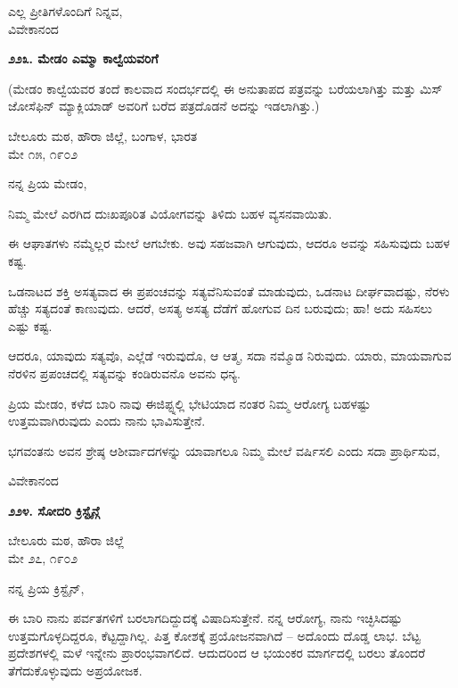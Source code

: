 \begin{flushright}
ಎಲ್ಲ ಪ್ರೀತಿಗಳೊಂದಿಗೆ ನಿನ್ನವ,\\ವಿವೇಕಾನಂದ
\end{flushright}

\begin{center}
\textbf{೨೨೩. ಮೇಡಂ ಎಮ್ಮಾ ಕಾಲ್ವೆಯವರಿಗೆ}
\end{center}

(ಮೇಡಂ ಕಾಲ್ವೆಯವರ ತಂದೆ ಕಾಲವಾದ ಸಂದರ್ಭದಲ್ಲಿ ಈ ಅನುತಾಪದ ಪತ್ರವನ್ನು ಬರೆಯಲಾಗಿತ್ತು ಮತ್ತು ಮಿಸ್ ಜೋಸೆಫಿನ್ ಮ್ಯಾಕ್ಲಿಯಾಡ್ ಅವರಿಗೆ ಬರೆದ ಪತ್ರದೊಡನೆ ಅದನ್ನು ಇಡಲಾಗಿತ್ತು.)

\begin{flushright}
ಬೇಲೂರು ಮಠ, ಹೌರಾ ಜಿಲ್ಲೆ, ಬಂಗಾಳ, ಭಾರತ\\ಮೇ ೧೫, ೧೯೦೨
\end{flushright}

ನನ್ನ ಪ್ರಿಯ ಮೇಡಂ,

ನಿಮ್ಮ ಮೇಲೆ ಎರಗಿದ ದುಃಖಪೂರಿತ ವಿಯೋಗವನ್ನು ತಿಳಿದು ಬಹಳ ವ್ಯಸನವಾಯಿತು.

ಈ ಆಘಾತಗಳು ನಮ್ಮೆಲ್ಲರ ಮೇಲೆ ಆಗಬೇಕು. ಅವು ಸಹಜವಾಗಿ ಆಗುವುದು, ಆದರೂ ಅವನ್ನು ಸಹಿಸುವುದು ಬಹಳ ಕಷ್ಟ.

ಒಡನಾಟದ ಶಕ್ತಿ ಅಸತ್ಯವಾದ ಈ ಪ್ರಪಂಚವನ್ನು ಸತ್ಯವೆನಿಸುವಂತೆ ಮಾಡುವುದು, ಒಡನಾಟ ದೀರ್ಘವಾದಷ್ಟು, ನೆರಳು ಹೆಚ್ಚು ಸತ್ಯದಂತೆ ಕಾಣುವುದು. ಆದರೆ, ಅಸತ್ಯ ಅಸತ್ಯ ದೆಡೆಗೆ ಹೋಗುವ ದಿನ ಬರುವುದು; ಹಾ! ಅದು ಸಹಿಸಲು ಎಷ್ಟು ಕಷ್ಟ.

ಆದರೂ, ಯಾವುದು ಸತ್ಯವೊ, ಎಲ್ಲೆಡೆ ಇರುವುದೊ, ಆ ಆತ್ಮ, ಸದಾ ನಮ್ಮೊಡ ನಿರುವುದು. ಯಾರು, ಮಾಯವಾಗುವ ನೆರಳಿನ ಪ್ರಪಂಚದಲ್ಲಿ ಸತ್ಯವನ್ನು ಕಂಡಿರುವನೊ ಅವನು ಧನ್ಯ.

ಪ್ರಿಯ ಮೇಡಂ, ಕಳೆದ ಬಾರಿ ನಾವು ಈಜಿಪ್ಟ್ನಲ್ಲಿ ಭೇಟಿಯಾದ ನಂತರ ನಿಮ್ಮ ಆರೋಗ್ಯ ಬಹಳಷ್ಟು ಉತ್ತಮವಾಗಿರುವುದು ಎಂದು ನಾನು ಭಾವಿಸುತ್ತೇನೆ.

ಭಗವಂತನು ಅವನ ಶ್ರೇಷ್ಠ ಆಶೀರ್ವಾದಗಳನ್ನು ಯಾವಾಗಲೂ ನಿಮ್ಮ ಮೇಲೆ ವರ್ಷಿಸಲಿ ಎಂದು ಸದಾ ಪ್ರಾರ್ಥಿಸುವ,

\begin{flushright}
ವಿವೇಕಾನಂದ
\end{flushright}

\begin{center}
\textbf{೨೨೪. ಸೋದರಿ ಕ್ರಿಸ್ಟೈನ್ಗೆ}
\end{center}

\begin{flushright}
ಬೇಲೂರು ಮಠ, ಹೌರಾ ಜಿಲ್ಲೆ\\ಮೇ ೨೭, ೧೯೦೨
\end{flushright}

ನನ್ನ ಪ್ರಿಯ ಕ್ರಿಸ್ಟೈನ್,

ಈ ಬಾರಿ ನಾನು ಪರ್ವತಗಳಿಗೆ ಬರಲಾಗದಿದ್ದುದಕ್ಕೆ ವಿಷಾದಿಸುತ್ತೇನೆ. ನನ್ನ ಆರೋಗ್ಯ, ನಾನು ಇಚ್ಛಿಸಿದಷ್ಟು ಉತ್ತಮಗೊಳ್ಳದಿದ್ದರೂ, ಕೆಟ್ಟದ್ದಾಗಿಲ್ಲ. ಪಿತ್ತ ಕೋಶಕ್ಕೆ ಪ್ರಯೋಜನವಾಗಿದೆ – ಅದೊಂದು ದೊಡ್ಡ ಲಾಭ. ಬೆಟ್ಟ ಪ್ರದೇಶಗಳಲ್ಲಿ ಮಳೆ ಇನ್ನೇನು ಪ್ರಾರಂಭವಾಗಲಿದೆ. ಆದುದರಿಂದ ಆ ಭಯಂಕರ ಮಾರ್ಗದಲ್ಲಿ ಬರಲು ತೊಂದರೆ ತೆಗೆದುಕೊಳ್ಳುವುದು ಅಪ್ರಯೋಜಕ.

